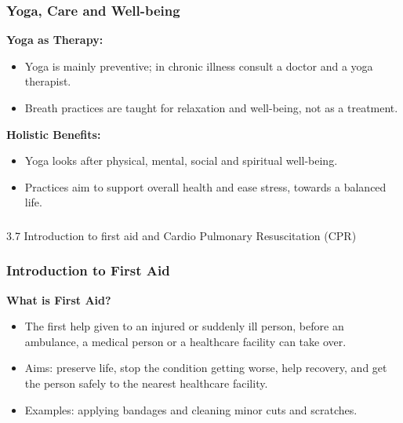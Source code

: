 \begin{frame}[fragile]\frametitle{Yoga, Care and Well-being}
    \textbf{Yoga as Therapy:}
    \begin{itemize}
        \item Yoga is mainly preventive; in chronic illness consult a doctor and a yoga therapist.
        \item Breath practices are taught for relaxation and well-being, not as a treatment.
    \end{itemize}

    \textbf{Holistic Benefits:}
    \begin{itemize}
        \item Yoga looks after physical, mental, social and spiritual well-being.
        \item Practices aim to support overall health and ease stress, towards a balanced life.
    \end{itemize}
\end{frame}

\begin{frame}[fragile]\frametitle{}
\begin{center}
{\Large 3.7 Introduction to first aid and Cardio Pulmonary Resuscitation (CPR)}
\end{center}
\end{frame}

\begin{frame}[fragile]\frametitle{Introduction to First Aid}
    \textbf{What is First Aid?}
    \begin{itemize}
        \item The first help given to an injured or suddenly ill person, before an ambulance, a medical person or a healthcare facility can take over.
        \item Aims: preserve life, stop the condition getting worse, help recovery, and get the person safely to the nearest healthcare facility.
        \item Examples: applying bandages and cleaning minor cuts and scratches.
    \end{itemize}
\end{frame}


